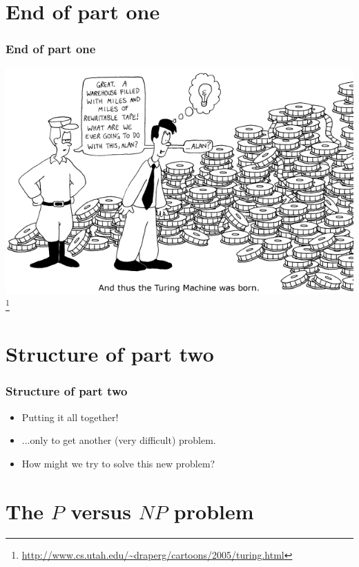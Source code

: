 \documentclass[aspectratio=169]{beamer}
\begin{document}
\section{End of part one}

\begin{frame}
\frametitle{End of part one}
\begin{center}
\includegraphics{turing_comic}\footnote{\url{http://www.cs.utah.edu/~draperg/cartoons/2005/turing.html}}
\end{center}
\end{frame}

\section{Structure of part two}

\begin{frame}
\frametitle{Structure of part two}
\begin{itemize}
    \item Putting it all together!
    \item ...only to get another (very difficult) problem.
    \item How might we try to solve this new problem?
\end{itemize}
\end{frame}

\section{The $P$ versus $NP$ problem}
\end{document}
